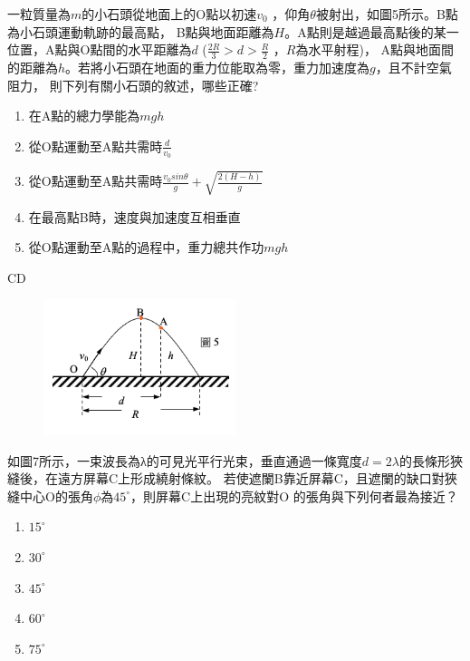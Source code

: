 \documentclass[cn,10pt,math=newtx,chinesefont=founder]{elegantbook}
\begin{document}
\begin{example}
    一粒質量為$m$的小石頭從地面上的O點以初速$v_0$ ，仰角$\theta$被射出，如圖5所示。B點為小石頭運動軌跡的最高點，
    B點與地面距離為$H$。A點則是越過最高點後的某一位置，A點與O點間的水平距離為$d$
     ($\frac{2R}{3} > d >\frac{R}{2}$ ，$R$為水平射程)，
    A點與地面間的距離為$h$。若將小石頭在地面的重力位能取為零，重力加速度為$g$，且不計空氣阻力，
    則下列有關小石頭的敘述，哪些正確?
    \begin{enumerate}[label=(\Alph*)]
        \item 在A點的總力學能為$mgh$
        \item 從O點運動至A點共需時$\frac{d}{v_0}$
        \item 從O點運動至A點共需時$\frac{v_0 sin\theta}{g}+\sqrt{\frac{2(H-h)}{g}}$
        \item 在最高點B時，速度與加速度互相垂直
        \item 從O點運動至A點的過程中，重力總共作功$mgh$
    \end{enumerate}
    \rightline{[93指考補考]}
\end{example}
\begin{solution}
    CD
\end{solution}
\begin{figure}[htbp]
    \flushright
    \includegraphics[width=0.5\textwidth]{image/93_c_11.png}
\end{figure}
\newpage


\begin{example}
    如圖7所示，一束波長為λ的可見光平行光束，垂直通過一條寬度$d=2\lambda$的長條形狹縫後，在遠方屏幕C上形成繞射條紋。
    若使遮闌B靠近屏幕C，且遮闌的缺口對狹縫中心O的張角$\phi$為$45^\circ$，則屏幕C上出現的亮紋對O
    的張角與下列何者最為接近？
    \begin{enumerate}[label=(\Alph*)]
        \item $15^\circ$
        \item $30^\circ$
        \item $45^\circ$
        \item $60^\circ$
        \item $75^\circ$
    \end{enumerate}
    \rightline{[94指考]}
\end{example}
\end{document}
